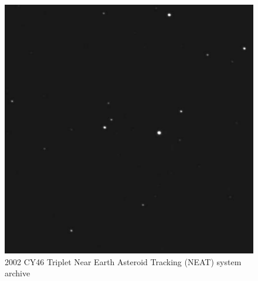 \begin{figure}
\endminipage\hfill
{}
  \includegraphics[width=\linewidth]{Figures/NEAT3.pdf}
\endminipage
\caption{2002 CY46 Triplet Near Earth Asteroid Tracking (NEAT) system archive}
\label{fig:NEAT_Images}
\end{figure}


